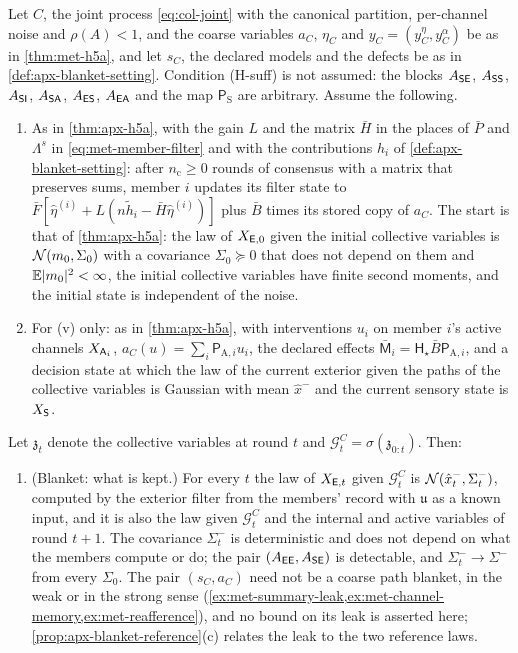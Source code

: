 \begin{theorem}\label{thm:apx-h5a-blanket}
Let $C$, the joint process \eqref{eq:col-joint} with the canonical partition, per-channel noise and $\rho(A)<1$, and the coarse variables $a_C$, $\eta_C$ and $y_C=(y^\eta_C,y^\alpha_C)$ be as in \cref{thm:met-h5a}, and let $s_C$, the declared models and the defects be as in \cref{def:apx-blanket-setting}. Condition (H-suff) is not assumed: the blocks $A_{\mathsf{S}\mathsf{E}}$, $A_{\mathsf{S}\mathsf{S}}$, $A_{\mathsf{S}\mathsf{I}}$, $A_{\mathsf{S}\mathsf{A}}$, $A_{\mathsf{E}\mathsf{S}}$, $A_{\mathsf{E}\mathsf{A}}$ and the map $\mathsf P_{\mathrm S}$ are arbitrary. Assume the following.
\begin{enumerate}
\item[(H-prot)] As in \cref{thm:apx-h5a}, with the gain $L$ and the matrix $\bar H$ in the places of $\bar P$ and $\Lambda^s$ in \eqref{eq:met-member-filter} and with the contributions $h_i$ of \cref{def:apx-blanket-setting}: after $n_{\mathrm c}\ge0$ rounds of consensus with a matrix that preserves sums, member $i$ updates its filter state to $\bar F[\hat\eta^{(i)}+L(n\tilde h_i-\bar H\hat\eta^{(i)})]$ plus $\bar B$ times its stored copy of $a_C$. The start is that of \cref{thm:apx-h5a}: the law of $X_{\mathsf{E},0}$ given the initial collective variables is $\mathcal{N}(m_0,\Sigma_0)$ with a covariance $\Sigma_0\succeq0$ that does not depend on them and $\mathbb{E}\lvert m_0\rvert^2<\infty$, the initial collective variables have finite second moments, and the initial state is independent of the noise.
\item[(H-act)] For (v) only: as in \cref{thm:apx-h5a}, with interventions $u_i$ on member $i$'s active channels $X_{\mathsf{A}_i}$, $a_C(u)=\sum_i\mathsf P_{\mathrm A,i}u_i$, the declared effects $\bar{\mathsf M}_i=\mathsf H_\star\bar B\mathsf P_{\mathrm A,i}$, and a decision state at which the law of the current exterior given the paths of the collective variables is Gaussian with mean $\hat x^-$ and the current sensory state is $X_{\mathsf{S}}$.
\end{enumerate}
Let $\mathfrak z_t$ denote the collective variables at round $t$ and $\mathcal G^C_t=\sigma(\mathfrak z_{0:t})$. Then:
\begin{enumerate}
\item[(i)] (Blanket: what is kept.) For every $t$ the law of $X_{\mathsf{E},t}$ given $\mathcal G^C_t$ is $\mathcal{N}(\hat x^-_t,\Sigma^-_t)$, computed by the exterior filter from the members' record with $\mathfrak u$ as a known input, and it is also the law given $\mathcal G^C_t$ and the internal and active variables of round $t+1$. The covariance $\Sigma^-_t$ is deterministic and does not depend on what the members compute or do; the pair $(A_{\mathsf{E}\mathsf{E}},A_{\mathsf{S}\mathsf{E}})$ is detectable, and $\Sigma^-_t\to\Sigma^-$ from every $\Sigma_0$. The pair $(s_C,a_C)$ need not be a coarse path blanket, in the weak or in the strong sense (\cref{ex:met-summary-leak,ex:met-channel-memory,ex:met-reafference}), and no bound on its leak is asserted here; \cref{prop:apx-blanket-reference}(c) relates the leak to the two reference laws.

\end{enumerate}
\end{theorem}
